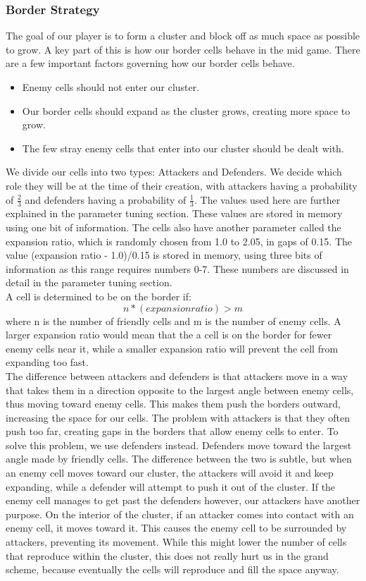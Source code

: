 \subsubsection{Border Strategy}
The goal of our player is to form a cluster and block off as much space as possible to grow. A key part of this is how our border cells behave in the mid game. There are a few important factors governing how our border cells behave.\\
\begin{itemize}
\item Enemy cells should not enter our cluster.
\item Our border cells should expand as the cluster grows, creating more space to grow.
\item The few stray enemy cells that enter into our cluster should be dealt with.
\end{itemize}
We divide our cells into two types: Attackers and Defenders. We decide which role they will be at the time of their creation, with attackers having a probability of $\frac{2}{3}$ and defenders having a probability of $\frac{1}{3}$. The values used here are further explained in the parameter tuning section. These values are stored in memory using one bit of information. The cells also have another parameter called the expansion ratio, which is randomly chosen from 1.0 to 2.05, in gaps of 0.15. The value (expansion ratio - 1.0)/0.15 is stored in memory, using three bits of information as this range requires numbers 0-7. These numbers are discussed in detail in the parameter tuning section.\\
A cell is determined to be on the border if:\\
\[n * (expansion ratio) > m\]
where n is the number of friendly cells and m is the number of enemy cells. A larger expansion ratio would mean that the a cell is on the border for fewer enemy cells near it, while a smaller expansion ratio will prevent the cell from expanding too fast.\\
The difference between attackers and defenders is that attackers move in a way that takes them in a direction opposite to the largest angle between enemy cells, thus moving toward enemy cells. This makes them push the borders outward, increasing the space for our cells. The problem with attackers is that they often push too far, creating gaps in the borders that allow enemy cells to enter. To solve this problem, we use defenders instead. Defenders move toward the largest angle made by friendly cells. The difference between the two is subtle, but when an enemy cell moves toward our cluster, the attackers will avoid it and keep expanding, while a defender will attempt to push it out of the cluster. If the enemy cell manages to get past the defenders however, our attackers have another purpose. On the interior of the cluster, if an attacker comes into contact with an enemy cell, it moves toward it. This causes the enemy cell to be surrounded by attackers, preventing its movement. While this might lower the number of cells that reproduce within the cluster, this does not really hurt us in the grand scheme, because eventually the cells will reproduce and fill the space anyway.

